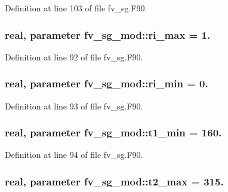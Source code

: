 Definition at line 103 of file fv\-\_\-sg.\-F90.

\subsubsection[{ri\-\_\-max}]{\setlength{\rightskip}{0pt plus 5cm}real, parameter fv\-\_\-sg\-\_\-mod\-::ri\-\_\-max = 1.\hspace{0.3cm}{\ttfamily [private]}}\label{classfv__sg__mod_af3111561e3086d6011cf81c50467d561}


Definition at line 92 of file fv\-\_\-sg.\-F90.

\subsubsection[{ri\-\_\-min}]{\setlength{\rightskip}{0pt plus 5cm}real, parameter fv\-\_\-sg\-\_\-mod\-::ri\-\_\-min = 0.\hspace{0.3cm}{\ttfamily [private]}}\label{classfv__sg__mod_a5a016eeeb112ccb46087279e37698ecb}


Definition at line 93 of file fv\-\_\-sg.\-F90.

\subsubsection[{t1\-\_\-min}]{\setlength{\rightskip}{0pt plus 5cm}real, parameter fv\-\_\-sg\-\_\-mod\-::t1\-\_\-min = 160.\hspace{0.3cm}{\ttfamily [private]}}\label{classfv__sg__mod_afe8eeeb134260859c1ff38fe74557123}


Definition at line 94 of file fv\-\_\-sg.\-F90.

\subsubsection[{t2\-\_\-max}]{\setlength{\rightskip}{0pt plus 5cm}real, parameter fv\-\_\-sg\-\_\-mod\-::t2\-\_\-max = 315.\hspace{0.3cm}{\ttfamily [private]}}\label{classfv__sg__mod_a17bd270ea0dba7816112efe5d704896c}


